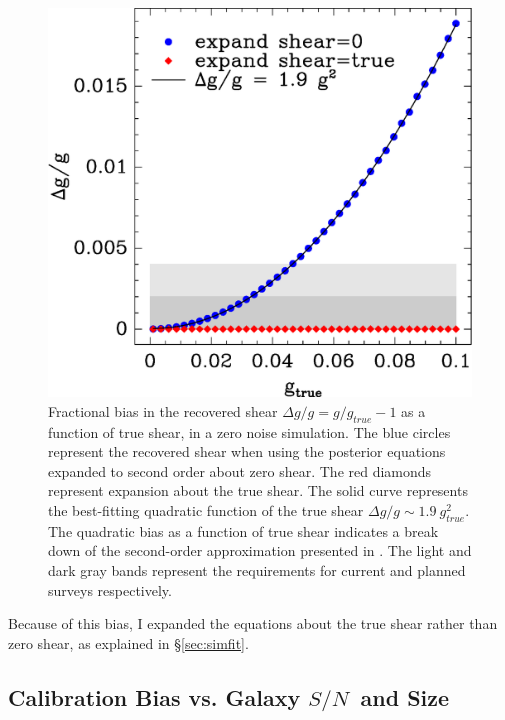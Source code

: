 \documentclass[12pt,preprint]{aastex}
\newcommand{\sn}{$S/N$}
\begin{document}
\begin{figure}[t] \centering
 \centering 
 \includegraphics[scale=0.6]{figures/fracerr-vs-shear.eps}

 \caption{Fractional bias in the recovered shear $\Delta g/g = g/g_{true}-1$
     as a function of true shear,
     in a zero noise simulation.  The blue circles represent the recovered
     shear when using the posterior equations expanded to second order about
     zero shear.  The red diamonds represent expansion about the true shear.
     The solid curve represents the best-fitting quadratic function of the true
     shear $\Delta g/g \sim 1.9~g^2_{true}$.  The quadratic bias as a function of
     true shear indicates a break down of the second-order approximation
 presented in \cite{ba14}. The light and dark gray bands represent the
 requirements for current and planned surveys respectively.
 \label{fig:nonoise}}

\end{figure}

Because of this bias, I expanded the equations about the true shear rather than
zero shear, as explained in \S \ref{sec:simfit}.

\subsection{Calibration Bias vs. Galaxy \sn\ and Size} \label{sec:snbias}
\end{document}
